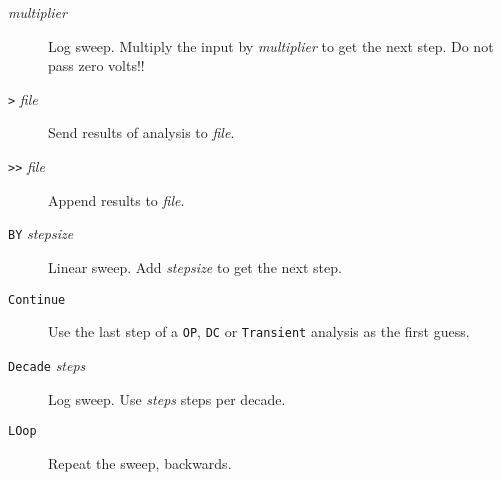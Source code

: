 \begin{description}

\item[{\tt *} {\it multiplier}] Log sweep.  Multiply the
input by {\it multiplier} to get the next step.  Do not
pass zero volts!!

\item[{\tt >} {\it file}] Send results of analysis to {\it file}.

\item[{\tt >>} {\it file}] Append results to {\it file}.



\item[{\tt BY} {\it stepsize}] Linear sweep.  Add {\it
stepsize} to get the next step.

\item[{\tt Continue}] Use the last step of a {\tt OP},
{\tt DC} or {\tt Transient} analysis as the first guess.



\item[{\tt Decade} {\it steps}] Log sweep.  Use {\it
steps} steps per decade.




\item[{\tt LOop}] Repeat the sweep, backwards.



\end{description}
